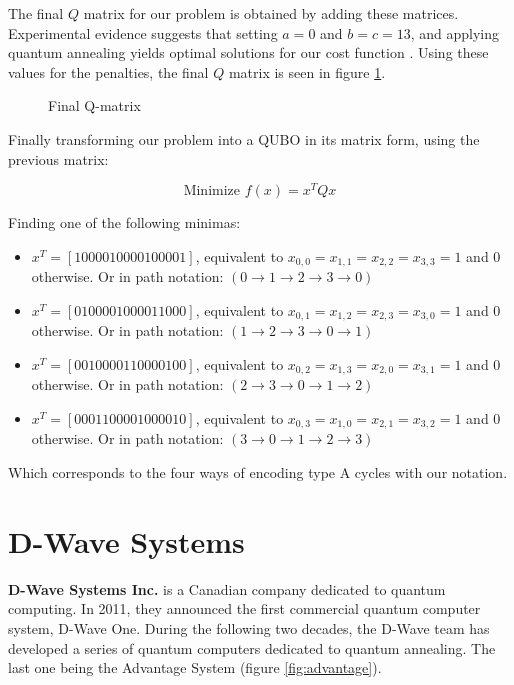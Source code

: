 The final $Q$ matrix for our problem is obtained by adding these matrices. Experimental evidence suggests that setting $a = 0$ and $b = c = 13$, and applying quantum annealing yields optimal solutions for our cost function \cite{Sarkar2020}. Using these values for the penalties, the final $Q$ matrix is seen in figure \ref{fig:salesman-Q-matrix}.

\begin{figure}[H]
	\centering
	\caption{Final Q-matrix \cite{Sarkar2020}}
	\label{fig:salesman-Q-matrix}
\end{figure}

Finally transforming our problem into a QUBO in its matrix form, using the previous matrix:

$$ \text{Minimize } f(x) = x^T Q x $$

Finding one of the following minimas:

\begin{itemize}
	\item $x^T = [1000010000100001]$, equivalent to $x_{0,0} = x_{1,1} = x_{2,2} = x_{3,3} = 1$ and $0$ otherwise. Or in path notation: $(0 \rightarrow 1 \rightarrow 2 \rightarrow 3 \rightarrow 0)$
	\item $x^T = [0100001000011000]$, equivalent to $x_{0,1} = x_{1,2} = x_{2,3} = x_{3,0} = 1$ and $0$ otherwise. Or in path notation: $(1 \rightarrow 2 \rightarrow 3 \rightarrow 0 \rightarrow 1)$
	\item $x^T = [0010000110000100]$, equivalent to $x_{0,2} = x_{1,3} = x_{2,0} = x_{3,1} = 1$ and $0$ otherwise. Or in path notation: $(2 \rightarrow 3 \rightarrow 0 \rightarrow 1 \rightarrow 2)$
	\item $x^T = [0001100001000010]$, equivalent to $x_{0,3} = x_{1,0} = x_{2,1} = x_{3,2} = 1$ and $0$ otherwise. Or in path notation: $(3 \rightarrow 0 \rightarrow 1 \rightarrow 2 \rightarrow 3)$
\end{itemize}

Which corresponds to the four ways of encoding type A cycles with our notation.


\FloatBarrier
\section{D-Wave Systems}
\label{sec:d-wave-systems}


\textbf{D-Wave Systems Inc.} is a Canadian company dedicated to quantum computing. In 2011, they announced the first commercial quantum computer system, D-Wave One. During the following two decades, the D-Wave team has developed a series of quantum computers dedicated to quantum annealing. The last one being the Advantage System (figure \ref{fig:advantage}).

